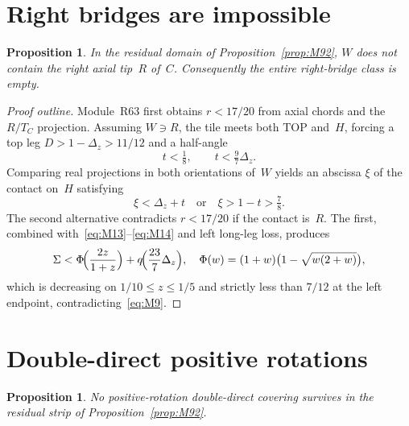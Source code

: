 \documentclass[11pt,reqno]{amsart}
\newtheorem{proposition}[theorem]{Proposition}
\theoremstyle{definition}
\newcommand{\TOP}{\mathrm{TOP}}
\begin{document}
\section{Right bridges are impossible}\label{sec:M10}

\begin{proposition}\label{prop:M101}
In the residual domain of Proposition~\ref{prop:M92}, $W$ does not contain the
right axial tip~$R$ of~$C$.  Consequently the entire right-bridge class is
empty.
\end{proposition}

\begin{proof}[Proof outline]
Module~R63 first obtains $r<17/20$ from axial chords and the $R/T_C$
projection.  Assuming $W\ni R$, the tile meets both $\TOP$ and~$H$, forcing a
top leg $D>1-\Delta_z>11/12$ and a half-angle
\begin{equation}\label{eq:M14}
t<\tfrac18,\qquad t<\tfrac97\Delta_z.
\end{equation}
Comparing real projections in both orientations of~$W$ yields an abscissa
$\xi$ of the contact on~$H$ satisfying
\begin{equation}\label{eq:M15}
\xi<\Delta_z+t
\quad\text{or}\quad
\xi>1-t>\tfrac78.
\end{equation}
The second alternative contradicts $r<17/20$ if the contact is~$R$.  The first,
combined with~\eqref{eq:M13}--\eqref{eq:M14} and left long-leg loss, produces
\begin{equation}
\Sigma<\Phi\!\Bigl(\frac{2z}{1+z}\Bigr)+q\!\Bigl(\frac{23}{7}\Delta_z\Bigr),
\quad
\Phi(w)=(1+w)\bigl(1-\sqrt{w(2+w)}\bigr),
\end{equation}
which is decreasing on $1/10\le z\le 1/5$ and strictly less than $7/12$ at the
left endpoint, contradicting~\eqref{eq:M9}.
\end{proof}

\section{Double-direct positive rotations}\label{sec:finale}

\begin{proposition}\label{prop:M111}
No positive-rotation double-direct covering survives in the residual strip of
Proposition~\ref{prop:M92}.
\end{proposition}
\end{document}

